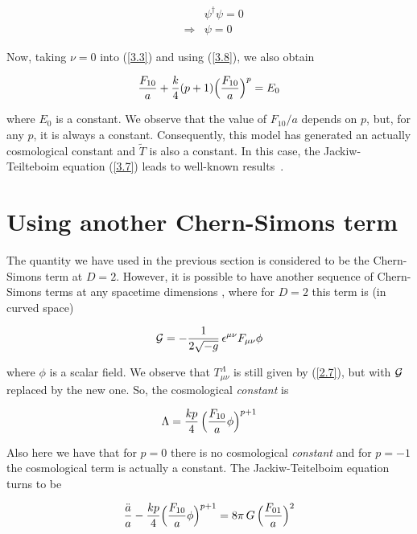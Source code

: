 \documentclass[a4paper,twocolumn,prd,groupedaddress,nofootinbib,showpacs]
{revtex4}
\begin{document}
\begin{eqnarray}
&&\psi^\dagger\psi=0
\nonumber\\
&\Rightarrow&\psi=0
\label{3.8}
\end{eqnarray}

\noindent
Now, taking $\nu=0$ into (\ref{3.3}) and using (\ref{3.8}), we also
obtain

\begin{equation}
\frac{F_{10}}{a}+\frac{k}{4}(p+1)\Bigl(\frac{F_{10}}{a}\Bigr)^p=E_0
\label{3.9}
\end{equation}

\noindent
where $E_0$ is a constant. We observe that the value of $F_{10}/a$
depends on $p$, but, for any $p$, it is always a constant.
Consequently, this model has generated an actually cosmological
constant and $\tilde T$ is also a constant. In this case, the Jackiw-
Teilteboim equation (\ref{3.7}) leads to well-known
results~\cite{Mann}.

\section{Using another Chern-Simons term}
\renewcommand{\theequation}{4.\arabic{equation}}
\setcounter{equation}{0}

The quantity we have used in the previous section is considered to be
the Chern-Simons term at $D=2$. However, it is possible to have
another sequence of Chern-Simons terms at any spacetime dimensions
\cite{Barcelos}, where for $D=2$ this term is (in curved space)

\begin{equation}
{\cal G}=-\frac{1}{2\sqrt{-g}}\,\epsilon^{\mu\nu}F_{\mu\nu}\phi
\label{4.1}
\end{equation}

\noindent
where $\phi$ is a scalar field. We observe that $T^\Lambda_{\mu\nu}$
is still given by (\ref{2.7}), but with $\cal G$ replaced by the new
one. So, the cosmological {\it constant} is

\begin{equation}
\Lambda=\frac{kp}{4}\,\Bigl(\frac{F_{10}}{a}\phi\Bigr)^{p+1}
\label{4.2}
\end{equation}

\noindent
Also here we have that for $p=0$ there is no cosmological {\it
constant} and for $p=-1$ the cosmological term is actually a constant.
The Jackiw-Teitelboim equation turns to be

\begin{equation}
\frac{\ddot a}{a}
-\frac{kp}{4}\Bigl(\frac{F_{10}}{a}\phi\Bigr)^{p+1}
=8\pi\,G\,\Bigl(\frac{F_{01}}{a}\Bigr)^2
\label{4.3}
\end{equation}
\end{document}
